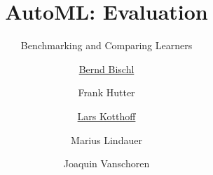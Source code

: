 


\usepackage{multirow}


\title[AutoML: Risks]{AutoML: Evaluation} %
\subtitle{Benchmarking and Comparing Learners} %
\author[Lars Kotthoff]{\underline{Bernd Bischl} \and Frank Hutter \and \underline{Lars Kotthoff}\newline \and Marius Lindauer \and Joaquin Vanschoren}
\institute{}
\date{}

\newcommand\reffootnote[1]{%
    \begingroup
    \renewcommand\thefootnote{}\footnote{
        \tiny #1
    \vspace*{1em}}%
    \addtocounter{footnote}{-1}%
    \endgroup
}



	
	\maketitle

